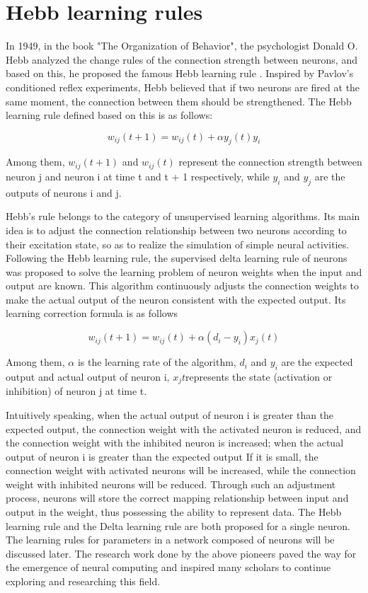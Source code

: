 \documentclass[12pt,a4paper]{report}
\begin{document}
\section{Hebb learning rules}
In 1949, in the book "The Organization of Behavior", the psychologist Donald O. Hebb analyzed the change rules of the connection strength between neurons, and based on this, he proposed the famous Hebb learning rule \cite{Hebb2002OrganizationBehaviorNeuropsychological}. Inspired by Pavlov's conditioned reflex experiments, Hebb believed that if two neurons are fired at the same moment, the connection between them should be strengthened. The Hebb learning rule defined based on this is as follows:

\begin{equation}
    w_{ij}(t + 1) = w_{ij}(t) + \alpha y_j(t)y_i
\end{equation}

Among them, $w_{ij}(t+1)$ and $w_{ij}(t)$ represent the connection strength between neuron j and neuron i at time t and t + 1 respectively, while $y_i$ and $y_j$ are the outputs of neurons i and j.


Hebb's rule belongs to the category of unsupervised learning algorithms. Its main idea is to adjust the connection relationship between two neurons according to their excitation state, so as to realize the simulation of simple neural activities. Following the Hebb learning rule, the supervised delta learning rule of neurons was proposed to solve the learning problem of neuron weights when the input and output are known. This algorithm continuously adjusts the connection weights to make the actual output of the neuron consistent with the expected output. Its learning correction formula is as follows


\begin{equation}
    w_{ij}(t + 1) = w_{ij}(t) + \alpha(d_i - y_i)x_j(t)
\end{equation}

Among them, $\alpha$ is the learning rate of the algorithm, $d_i$ and $y_i$ are the expected output and actual output of neuron i, $x_j{t}$represents the state (activation or inhibition) of neuron j at time t.

Intuitively speaking, when the actual output of neuron i is greater than the expected output, the connection weight with the activated neuron is reduced, and the connection weight with the inhibited neuron is increased; when the actual output of neuron i is greater than the expected output If it is small, the connection weight with activated neurons will be increased, while the connection weight with inhibited neurons will be reduced. Through such an adjustment process, neurons will store the correct mapping relationship between input and output in the weight, thus possessing the ability to represent data. The Hebb learning rule and the Delta learning rule are both proposed for a single neuron. The learning rules for parameters in a network composed of neurons will be discussed later. The research work done by the above pioneers paved the way for the emergence of neural computing and inspired many scholars to continue exploring and researching this field.
\end{document}

